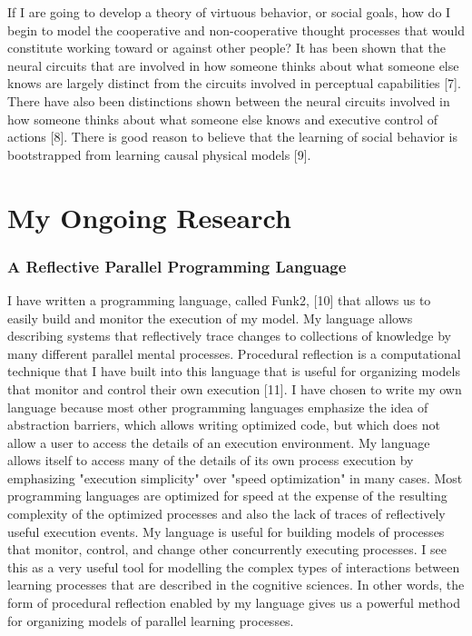 If I are going to develop a theory of virtuous behavior, or social
goals, how do I begin to model the cooperative and non-cooperative
thought processes that would constitute working toward or against
other people? It has been shown that the neural circuits that are
involved in how someone thinks about what someone else knows are
largely distinct from the circuits involved in perceptual capabilities
[7]. There have also been distinctions shown between the neural
circuits involved in how someone thinks about what someone else knows
and executive control of actions [8]. There is good reason to believe
that the learning of social behavior is bootstrapped from learning
causal physical models [9].

\section{My Ongoing Research}

\subsubsection{A Reflective Parallel Programming Language}

I have written a programming language, called Funk2, [10] that allows
us to easily build and monitor the execution of my model. My
language allows describing systems that reflectively trace changes to
collections of knowledge by many different parallel mental
processes. Procedural reflection is a computational technique that I
have built into this language that is useful for organizing models
that monitor and control their own execution [11]. I have chosen to
write my own language because most other programming languages
emphasize the idea of abstraction barriers, which allows writing
optimized code, but which does not allow a user to access the details
of an execution environment. My language allows itself to access many
of the details of its own process execution by emphasizing "execution
simplicity" over "speed optimization" in many cases. Most programming
languages are optimized for speed at the expense of the resulting
complexity of the optimized processes and also the lack of traces of
reflectively useful execution events. My language is useful for
building models of processes that monitor, control, and change other
concurrently executing processes. I see this as a very useful tool
for modelling the complex types of interactions between learning
processes that are described in the cognitive sciences. In other
words, the form of procedural reflection enabled by my language gives
us a powerful method for organizing models of parallel learning
processes.

